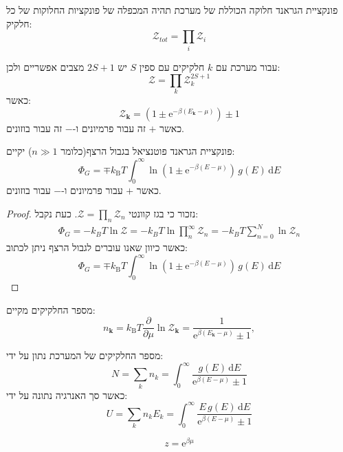 \documentclass{tstextbook}
\begin{document}
\begin{proposition}
פונקציית הגראנד חלוקה הכוללת של מערכת תהיה המכפלה של פונקציות החלוקות של כל חלקיק:
$${\mathcal{Z}}_{t o t}=\prod_{i}{\mathcal{Z}}_{i}$$

\end{proposition}
\begin{example}
עבור מערכת עם \(k\) חלקיקים עם ספין \(S\) יש \(2S+1\) מצבים אפשריים ולכן:
$$\mathcal{Z}=\prod_{k}\mathcal{Z}_{k}^{2S+1}$$
כאשר:
$${\mathcal{Z}}_{\mathbf{k}}=\left(1\pm\mathrm{e}^{-\beta(E_{\mathbf{k}}-\mu)}\right)\pm1$$
כאשר \(+\) זה עבור פרמיונים ו-\(-\) זה עבור בוזונים.

\end{example}
\begin{proposition}
פונקציית הגראנד פוטנציאל בגבול הרצף(כלומר \(n\gg 1\)) יקיים:
$$\Phi_{G}= \mp k_{\mathrm{B}}T\int_{0}^{\infty}\ln\left( 1\pm\mathrm{e}^{-\beta\left( E-\mu \right)} \right)\,g(E)\,\mathrm{d}E $$
כאשר \(+\) עבור פרמיונים ו-\(-\) עבור בוזונים.

\end{proposition}
\begin{proof}
נזכור כי בגז קוונטי \(\mathcal{Z}=\prod_{n}\mathcal{Z}_{n}\). כעת נקבל:
$$\begin{gather}\Phi_{G}=-k_{B}T\ln \mathcal{Z} =-k_{B}T\ln \prod_{n}^{\infty}\mathcal{Z} _{n} =-k_{B}T\sum_{n=0}^{N} \ln \mathcal{Z} _{n}
\end{gather}$$
כאשר כיוון שאנו עוברים לגבול הרצף ניתן לכתוב:
$$
\Phi_{G}=\mp k_{\mathrm{B}}T\int_{0}^{\infty}\ln\left( 1\pm\mathrm{e}^{-\beta\left( E-\mu \right)} \right)\,g(E)\,\mathrm{d}E $$

\end{proof}
\begin{proposition}
מספר החלקיקים מקיים:
$$n_{\mathbf{k}}=k_{\mathrm{B}}T{\frac{\partial}{\partial\mu}}\ln{\mathcal{Z}}_{\mathbf{k}}={\frac{1}{\mathrm{e}^{\beta(E_{\mathbf{k}}-\mu)}\pm1}},$$

\end{proposition}
\begin{corollary}
מספר החלקיקים של המערכת נתון על ידי:
$$N=\sum_{k}n_{k}=\int_{0}^{\infty}{\frac{g(E)\,\mathrm{d}E}{\mathrm{e}^{\beta(E-\mu)}\pm1}}$$
כאשר סך האנרגיה נתונה על ידי:
$$U=\sum_{k}n_{k}E_{k}=\int_{0}^{\infty}\frac{E\,g(E)\,\mathrm{d}E}{\mathrm{e}^{\beta(E-\mu)}\pm1}$$

\end{corollary}
\begin{definition}
$$z=\mathrm{e}^{\beta\mu}$$

\end{definition}
\end{document}
